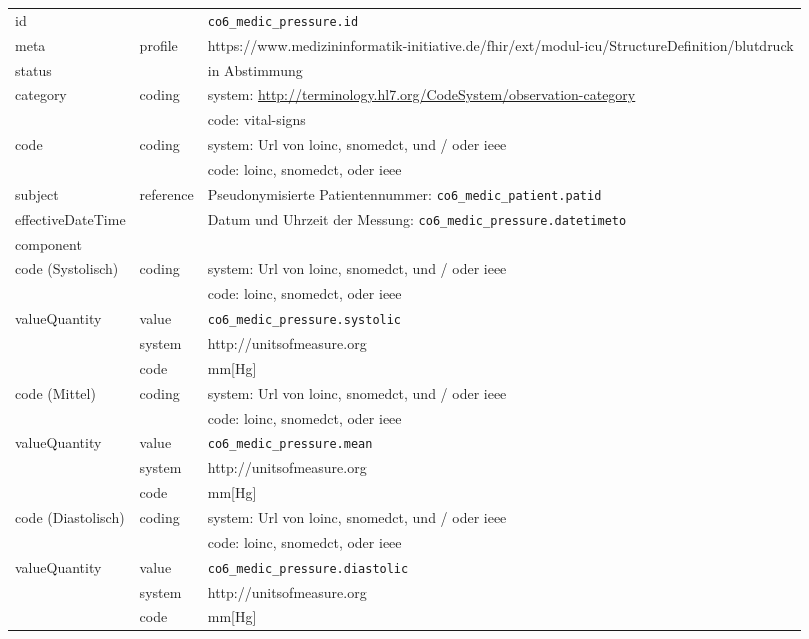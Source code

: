 \begin{longtable}{|l|l|p{7.5cm}|}
        \hline
        \rowcolor{lightgray} \multicolumn{3}{|l|}{Data Mapping (inhaltlich)} \\ \hline
        id &  & \texttt{co6\_medic\_pressure.id} \\ \hline
	meta & profile & https://www.medizininformatik-initiative.de/fhir/ext/modul-icu/StructureDefinition/blutdruck \\ \hline 
	status &  & in Abstimmung  \\ \hline 
	category & coding & system: \url{http://terminology.hl7.org/CodeSystem/observation-category} \\ 
\cline{3-3}
        & & code: vital-signs \\ \hline
        code & coding & system: Url von \ac{loinc}, \ac{snomedct}, und / oder \ac{ieee} \\
        \cline{3-3}
         &  & code: \ac{loinc}, \ac{snomedct}, oder \ac{ieee} \\ \hline
        subject & reference & Pseudonymisierte Patientennummer: \texttt{co6\_medic\_patient.patid} \\ \hline
        effectiveDateTime & & Datum und Uhrzeit der Messung:  \texttt{co6\_medic\_pressure.datetimeto} \\ \hline
	\multicolumn{3}{|l|}{component} \\ \hline
	code (Systolisch)  & coding & system: Url von \ac{loinc}, \ac{snomedct}, und / oder \ac{ieee} \\ 
	\cline{3-3} 
	&  & code: \ac{loinc}, \ac{snomedct}, oder \ac{ieee} \\ \hline	
	valueQuantity & value & \texttt{co6\_medic\_pressure.systolic} \\
	\cline{2-3}
	& system & http://unitsofmeasure.org \\ 
	\cline{2-3}
	& code & mm[Hg] \\ \hline
	code (Mittel)  & coding & system: Url von \ac{loinc}, \ac{snomedct}, und / oder \ac{ieee} \\ 
	\cline{3-3} 
	&  & code: \ac{loinc}, \ac{snomedct}, oder \ac{ieee} \\ \hline	
	valueQuantity & value & \texttt{co6\_medic\_pressure.mean} \\
	\cline{2-3}
	& system & http://unitsofmeasure.org \\ 
	\cline{2-3}
	& code &  mm[Hg] \\ \hline
	code (Diastolisch)  & coding & system: Url von \ac{loinc}, \ac{snomedct}, und / oder \ac{ieee} \\ 
	\cline{3-3} 
	&  & code: \ac{loinc}, \ac{snomedct}, oder \ac{ieee} \\ \hline	
	valueQuantity & value & \texttt{co6\_medic\_pressure.diastolic} \\
	\cline{2-3}
	& system & http://unitsofmeasure.org \\ 
	\cline{2-3}
	& code & mm[Hg] \\ \hline
\end{longtable}

